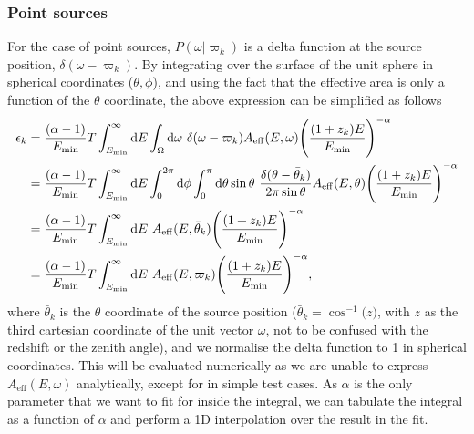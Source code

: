 \documentclass[fontsize=12pt]{article}
\begin{document}
\subsubsection{Point sources}
For the case of point sources, $P(\omega | \varpi_k)$ is a delta function at the source position, $\delta(\omega - \varpi_k)$. By integrating over the surface of the unit sphere in spherical coordinates ($\theta, \phi$), and using the fact that the effective area is only a function of the $\theta$ coordinate, the above expression can be simplified as follows
\begin{equation}
\begin{split}
\epsilon_{k} & = \frac{(\alpha -1)}{E_\mathrm{min}} T \int_{E_{\rm{min}}}^{\infty} \mathrm{d}E \int_\Omega \mathrm{d}\omega \ \delta(\omega - \varpi_k) A_\mathrm{eff}(E, \omega) \Bigg( \frac{(1+z_k)E}{E_\mathrm{min}} \Bigg)^{-\alpha} \\
& = \frac{(\alpha -1)}{E_\mathrm{min}} T \int_{E _\mathrm{min}}^{\infty} \mathrm{d}E \int_0^{2\pi} \mathrm{d}\phi \int_0^{\pi} \mathrm{d}\theta \sin{\theta} \ \frac{\delta(\theta - \bar{\theta}_k)}{2\pi \sin{\theta}} A_\mathrm{eff}(E, \theta) \Bigg( \frac{(1+z_k)E}{E_\mathrm{min}} \Bigg)^{-\alpha} \\
& = \frac{(\alpha -1)}{E_\mathrm{min}} T \int_{E _\mathrm{min}}^{\infty} \mathrm{d}E \ A_\mathrm{eff}(E, \bar{\theta}_k) \Bigg( \frac{(1+z_k)E}{E_\mathrm{min}} \Bigg)^{-\alpha} \\
& = \frac{(\alpha -1)}{E_\mathrm{min}} T \int_{E _\mathrm{min}}^{\infty} \mathrm{d}E \ A_\mathrm{eff}(E, \varpi_k) \Bigg( \frac{(1+z_k)E}{E_\mathrm{min}} \Bigg)^{-\alpha},
\end{split}
\end{equation}
where $\bar{\theta}_k$ is the $\theta$ coordinate of the source position ($\bar{\theta}_k = \cos^{-1}{(z})$, with $z$ as the third cartesian coordinate of the unit vector $\omega$, not to be confused with the redshift or the zenith angle), and we normalise the delta function to 1 in spherical coordinates. This will be evaluated numerically as we are unable to express $A_\mathrm{eff}(E, \omega)$ analytically, except for in simple test cases. As $\alpha$ is the only parameter that we want to fit for inside the integral, we can tabulate the integral as a function of $\alpha$ and perform a 1D interpolation over the result in the fit. 
\end{document}
